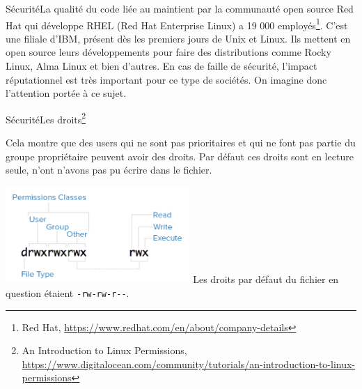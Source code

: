 \documentclass{beamer}
\begin{document}
    \begin{frame}{Sécurité}{La qualité du code liée au maintient par la communauté open source}
        Red Hat qui développe RHEL (Red Hat Enterprise Linux) a 19 000 employés\footnote{Red Hat, \url{https://www.redhat.com/en/about/company-details}}.
        \bigbreak
        C'est une filiale d'IBM, présent dès les premiers jours de Unix et Linux.
        \bigbreak
        Ils mettent en open source leurs développements pour faire des distributions comme Rocky Linux, Alma Linux et bien d'autres.
        \bigbreak
        En cas de faille de sécurité, l'impact réputationnel est très important pour ce type de sociétés.
        On imagine donc l'attention portée à ce sujet.
    \end{frame}

    \begin{frame}{Sécurité}{Les droits\footnote{\label{rights-digitalocean}An Introduction to Linux Permissions, \url{https://www.digitalocean.com/community/tutorials/an-introduction-to-linux-permissions}}}
        \begin{dangercolorbox}
            Cela montre que des users qui ne sont pas prioritaires et qui ne font pas partie du groupe propriétaire peuvent avoir des droits.
            Par défaut ces droits sont en lecture seule, n'ont n'avons pas pu écrire dans le fichier.
        \end{dangercolorbox}
        \centering
        \includegraphics[width=7cm]{image/permission-classes}
        \flushleft
        Les droits par défaut du fichier en question étaient \lstinline{-rw-rw-r--}.
    \end{frame}
\end{document}

